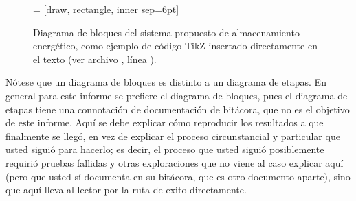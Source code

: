 \begin{figure}[htb]

  
  \centering
   = [draw, rectangle, inner sep=6pt]
  \caption[Diagrama de bloques.]{Diagrama de bloques del sistema
    propuesto de almacenamiento energético, como ejemplo de código
    TikZ insertado directamente en el texto (ver archivo
    , línea \number{}).}
  \label{fig:diagbloques}
\end{figure}

Nótese que un diagrama de bloques es distinto a un diagrama de etapas.
En general para este informe se prefiere el diagrama de bloques, pues
el diagrama de etapas tiene una connotación de documentación de
bitácora, que no es el objetivo de este informe.  Aquí se debe
explicar cómo reproducir los resultados a que finalmente se llegó, en
vez de explicar el proceso circunstancial y particular que usted
siguió para hacerlo; es decir, el proceso que usted siguió
posiblemente requirió pruebas fallidas y otras exploraciones que no
viene al caso explicar aquí (pero que usted sí documenta en su
bitácora, que es otro documento aparte), sino que aquí lleva al lector
por la ruta de exito directamente.

